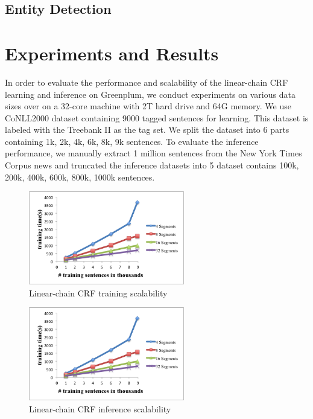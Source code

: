 \documentclass[11pt,letterpaper]{article}
\begin{document}



\subsection{Entity Detection}

\section{Experiments and Results}
In order to evaluate the performance and scalability of the linear-chain CRF learning and inference on Greenplum,
we conduct experiments on various data sizes over on a 32-core machine with 2T hard drive and 64G memory.
We use CoNLL2000 dataset containing 9000 tagged sentences for learning. This dataset is labeled with the Treebank II
as the tag set. We split the dataset into 6 parts containing 1k, 2k, 4k, 6k, 8k, 9k sentences.
To evaluate the inference performance, we manually extract 1 million sentences from the New York Times Corpus
news and truncated the inference datasets into 5 dataset contains 100k, 200k, 400k, 600k, 800k, 1000k sentences.

\begin{figure}
\centering
\includegraphics[height=11em]{training}
\caption{Linear-chain CRF training scalability}
\label{fig:crftrain}
\end{figure}

\begin{figure}
\centering
\includegraphics[height=11em]{training}
\caption{Linear-chain CRF inference scalability}
\label{fig:crftrain}
\end{figure}
\end{document}
